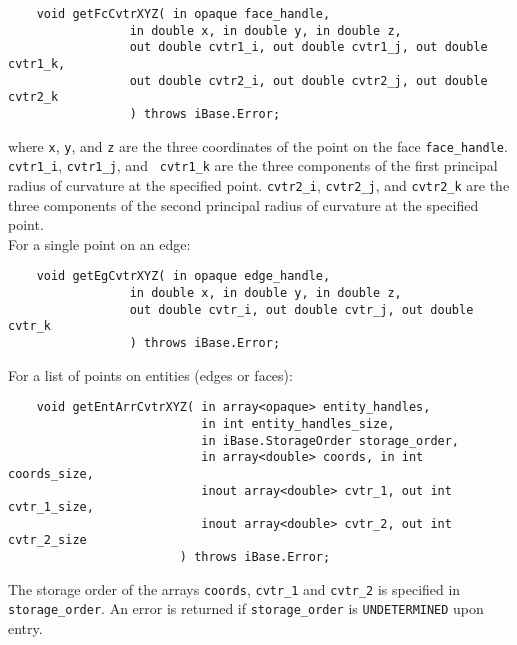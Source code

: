\documentclass{article}
\begin{document}
\begin{verbatim}
    void getFcCvtrXYZ( in opaque face_handle, 
                 in double x, in double y, in double z,
                 out double cvtr1_i, out double cvtr1_j, out double cvtr1_k,
                 out double cvtr2_i, out double cvtr2_j, out double cvtr2_k
                 ) throws iBase.Error;
\end{verbatim}
where {\tt x}, {\tt y}, and {\tt z} are the three coordinates of the point 
on the face {\tt face\_handle}. {\tt cvtr1\_i}, {\tt cvtr1\_j}, and {\tt
  cvtr1\_k} are the three
components of the first principal radius of curvature at the specified
point. {\tt cvtr2\_i}, {\tt cvtr2\_j}, and {\tt cvtr2\_k}
are the three components of the second principal radius 
of curvature at the specified point.\\ %

\hspace{-16pt}For a single point on an edge:
\begin{verbatim}
    void getEgCvtrXYZ( in opaque edge_handle, 
                 in double x, in double y, in double z,
                 out double cvtr_i, out double cvtr_j, out double cvtr_k
                 ) throws iBase.Error;
\end{verbatim}

\hspace{-16pt}For a list of points on entities (edges or faces):

\begin{verbatim}
    void getEntArrCvtrXYZ( in array<opaque> entity_handles, 
                           in int entity_handles_size,
                           in iBase.StorageOrder storage_order,
                           in array<double> coords, in int coords_size,
                           inout array<double> cvtr_1, out int cvtr_1_size,
                           inout array<double> cvtr_2, out int cvtr_2_size
                        ) throws iBase.Error;
\end{verbatim}
The storage order of the arrays {\tt coords}, {\tt cvtr\_1} and {\tt cvtr\_2} is specified
in {\tt storage\_order}. An error is returned if {\tt storage\_order}
 is {\tt UNDETERMINED} upon entry.
\end{document}
